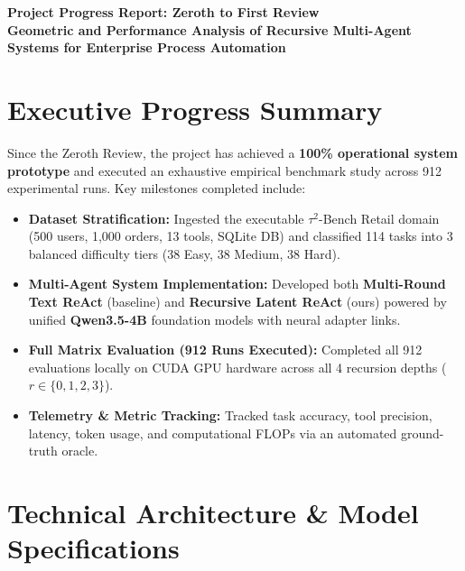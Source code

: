 \documentclass[11pt,a4paper]{article}
\begin{document}
\begin{center}
    {\LARGE \textbf{Project Progress Report: Zeroth to First Review}}\\[3pt]
    {\large \textbf{Geometric and Performance Analysis of Recursive Multi-Agent Systems for Enterprise Process Automation}}\\[5pt]
\end{center}
\vspace{2pt}

\section{Executive Progress Summary}
Since the Zeroth Review, the project has achieved a \textbf{100\% operational system prototype} and executed an exhaustive empirical benchmark study across 912 experimental runs. Key milestones completed include:
\begin{itemize}
    \item \textbf{Dataset Stratification:} Ingested the executable $\tau^2$-Bench Retail domain (500 users, 1,000 orders, 13 tools, SQLite DB) and classified 114 tasks into 3 balanced difficulty tiers (38 Easy, 38 Medium, 38 Hard).
    \item \textbf{Multi-Agent System Implementation:} Developed both \textbf{Multi-Round Text ReAct} (baseline) and \textbf{Recursive Latent ReAct} (ours) powered by unified \textbf{Qwen3.5-4B} foundation models with neural adapter links.
    \item \textbf{Full Matrix Evaluation (912 Runs Executed):} Completed all 912 evaluations locally on CUDA GPU hardware across all 4 recursion depths ($r \in \{0, 1, 2, 3\}$).
    \item \textbf{Telemetry \& Metric Tracking:} Tracked task accuracy, tool precision, latency, token usage, and computational FLOPs via an automated ground-truth oracle.
\end{itemize}

\section{Technical Architecture \& Model Specifications}
\end{document}
